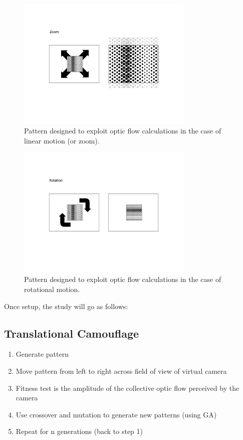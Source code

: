\documentclass[12pt,letter]{article}
\begin{document}
\begin{figure}[H]
    \centering
    \includegraphics[width=0.75\textwidth]{opticflow_diagrams-02.png}
    \caption{Pattern designed to exploit optic flow calculations in the case of linear motion (or zoom).}
    \label{fig:lieflat}
\end{figure}

\begin{figure}[H]
    \centering
    \includegraphics[width=0.75\textwidth]{opticflow_diagrams-03.png}
    \caption{Pattern designed to exploit optic flow calculations in the case of rotational motion.}
    \label{fig:lieflat}
\end{figure}

\vspace{5mm}Once setup, the study will go as follows:

\subsection{Translational Camouflage}
\begin{enumerate}
\item Generate pattern
\item Move pattern from left to right across field of view of virtual camera
\item Fitness test is the amplitude of the collective optic flow perceived by the camera
\item Use crossover and mutation to generate new patterns (using GA)
\item Repeat for n generations (back to step 1)
\end{enumerate} 
\end{document}

